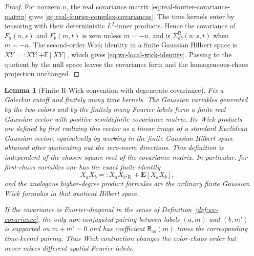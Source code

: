 \documentclass[10pt]{amsart}
\numberwithin{equation}{section}
\theoremstyle{plain}
\newtheorem{lemma}[theorem]{Lemma}
\theoremstyle{definition}
\theoremstyle{remark}
\begin{document}
\begin{proof}
For nonzero \(n\), the real covariance matrix \eqref{eq:real-fourier-covariance-matrix} gives \eqref{eq:real-fourier-complex-covariances}.  The time kernels enter by tensoring with their deterministic \(L^2\)-inner products.  Hence the covariance of \(F_a(n,s)\) and \(F_b(m,t)\) is zero unless \(m=-n\), and is \(\Sigma_{ab}^{\mathsf R}(n;s,t)\) when \(m=-n\).  The second-order Wick identity in a finite Gaussian Hilbert space is \(XY=:XY:+\mathbb E[XY]\), which gives \eqref{eq:wc-local-wick-identity}.  Passing to the quotient by the null space leaves the covariance form and the homogeneous-chaos projection unchanged.
\end{proof}

\begin{lemma}[Finite R-Wick convention with degenerate covariance]\label{lem:wc-degenerate-finite-wick}
Fix a Galerkin cutoff and finitely many time kernels.  The Gaussian variables generated by the two colors and by the finitely many Fourier labels form a finite real Gaussian vector with positive semidefinite covariance matrix.  Its Wick products are defined by first realizing this vector as a linear image of a standard Euclidean Gaussian vector, equivalently by working in the finite Gaussian Hilbert space obtained after quotienting out the zero-norm directions.  This definition is independent of the chosen square root of the covariance matrix.  In particular, for first-chaos variables one has the exact finite identity
\[
        X_aX_b=:X_aX_b:_{\mathsf R}+\mathbf E[X_aX_b],
\]
and the analogous higher-degree product formulas are the ordinary finite Gaussian Wick formulas in that quotient Hilbert space.

If the covariance is Fourier-diagonal in the sense of Definition~\ref{def:wc-covariance}, the only non-conjugated pairing between labels \((a,m)\) and \((b,m')\) is supported on \(m+m'=0\) and has coefficient \(\mathsf R_{ab}(m)\) times the corresponding time-kernel pairing.  Thus Wick contraction changes the color-chaos order but never mixes different spatial Fourier labels.
\end{lemma}
\end{document}
